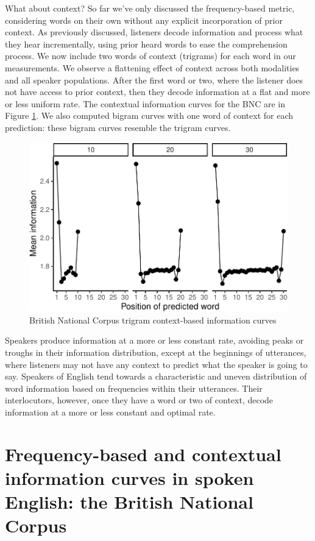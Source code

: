 \documentclass[man,floatsintext]{apa6}
\begin{document}
What about context? So far we've only discussed the frequency-based metric, considering words on their own without any explicit incorporation of prior context. As previously discussed, listeners decode information and process what they hear incrementally, using prior heard words to ease the comprehension process. We now include two words of context (trigrams) for each word in our measurements. We observe a flattening effect of context across both modalities and all speaker populations. After the first word or two, where the listener does not have access to prior context, then they decode information at a flat and more or less uniform rate. The contextual information curves for the BNC are in Figure \ref{fig:bnc-trigrams}. We also computed bigram curves with one word of context for each prediction: these bigram curves resemble the trigram curves.

\begin{figure}
\centering
\includegraphics{figs/bnc-trigrams-1.pdf}
\caption{\label{fig:bnc-trigrams}British National Corpus trigram context-based information curves}
\end{figure}

Speakers produce information at a more or less constant rate, avoiding peaks or troughs in their information distribution, except at the beginnings of utterances, where listeners may not have any context to predict what the speaker is going to say. Speakers of English tend towards a characteristic and uneven distribution of word information based on frequencies within their utterances. Their interlocutors, however, once they have a word or two of context, decode information at a more or less constant and optimal rate.

\hypertarget{frequency-based-and-contextual-information-curves-in-spoken-english-the-british-national-corpus}{%
\section{Frequency-based and contextual information curves in spoken English: the British National Corpus}\label{frequency-based-and-contextual-information-curves-in-spoken-english-the-british-national-corpus}}
\end{document}
